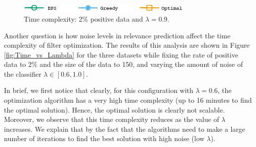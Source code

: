 


\begin{figure}[H]
\begin{centering}
\includegraphics[width=8.5cm]{imgs/legend2}
\par\end{centering}
\begin{centering}
\par\end{centering}
\caption{Time complexity: 2\% positive data and  $\lambda=0.9$.}
\label{fig:Time_vs_Data}
\end{figure}



  Another question is how noise levels in relevance prediction affect the time complexity of filter optimization.  The results of this analysis are shown in Figure \ref{fig:Time_vs_Lambda} for the three datasets while fixing the rate of positive data to 2\% and the size of the data to 150, and varying the amount of noise of the classifier $\lambda \in [0.6,1.0]$.

In brief, we first notice that clearly, for this configuration with $\lambda=0.6$, the optimization algorithm has a very high time complexity (up to 16 minutes to find the optimal solution). Hence, the optimal solution is clearly not scalable. Moreover, we observe that this time complexity reduces as the value of $\lambda$ increases. We explain that by the fact that the algorithms need to make a large number of iterations to find the best solution with high noise (low $\lambda$).



